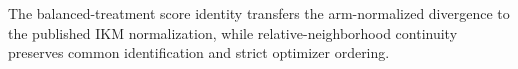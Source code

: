 The balanced-treatment score identity transfers the arm-normalized divergence to the published IKM normalization, while relative-neighborhood continuity preserves common identification and strict optimizer ordering.
